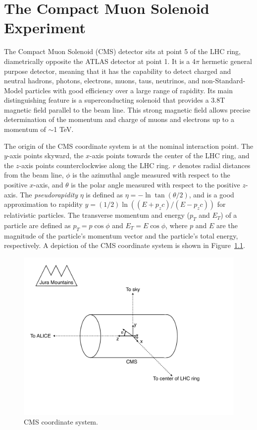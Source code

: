 \documentclass[dissertation.tex]{subfiles}
\begin{document}
\chapter{The Compact Muon Solenoid Experiment}
\label{chap:The Compact Muon Solenoid Experiment}

\thispagestyle{myheadings}
\markright{\hfill}

The Compact Muon Solenoid (CMS) detector sits at point 5 of the LHC ring, diametrically opposite the ATLAS detector at point 1.  It is a 4$\pi$ hermetic general purpose detector, meaning that it has the capability to detect charged and neutral hadrons, photons, electrons, muons, taus, neutrinos, and non-Standard-Model particles with good efficiency over a large range of rapidity.  Its main distinguishing feature is a superconducting solenoid that provides a 3.8T magnetic field parallel to the beam line.  This strong magnetic field allows precise determination of the momentum and charge of muons and electrons up to a momentum of $\sim$1 TeV.

The origin of the CMS coordinate system is at the nominal interaction point.  The $y$-axis points skyward, the $x$-axis points towards the center of the LHC ring, and the $z$-axis points counterclockwise along the LHC ring.  $r$ denotes radial distances from the beam line, $\phi$ is the azimuthal angle measured with respect to the positive $x$-axis, and $\theta$ is the polar angle measured with respect to the positive $z$-axis.  The \textit{pseudorapidity} $\eta$ is defined as $\eta = -\ln\tan(\theta/2)$, and is a good approximation to rapidity $y = (1/2)\ln((E + p_{z}c)/(E - p_{z}c))$ for relativistic particles.  The transverse momentum and energy ($p_{T}$ and $E_{T}$) of a particle are defined as $p_{T} = p\cos\phi$ and $E_{T} = E\cos\phi$, where $p$ and $E$ are the magnitude of the particle's momentum vector and the particle's total energy, respectively.  A depiction of the CMS coordinate system is shown in Figure~\ref{fig:CMS_coordinate_system}.

\begin{figure}
	\centering
	\includegraphics[scale=0.5]{CMS_coordinate_system}
	\caption{CMS coordinate system.}
	\label{fig:CMS_coordinate_system}
\end{figure}
\end{document}
